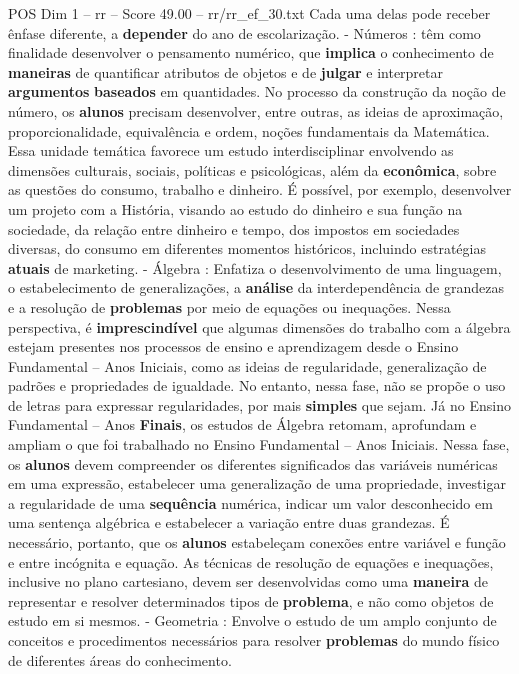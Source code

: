 \begin{textsample}{POS Dim 1 – rr – Score 49.00 – rr/rr\_ef\_30.txt}
Cada uma delas pode receber ênfase diferente, a \textbf{depender} do ano de escolarização. - Números : têm como finalidade desenvolver o pensamento numérico, que \textbf{implica} o conhecimento de \textbf{maneiras} de quantificar atributos de objetos e de \textbf{julgar} e interpretar \textbf{argumentos} \textbf{baseados} em quantidades.
No processo da construção da noção de número, os \textbf{alunos} precisam desenvolver, entre outras, as ideias de aproximação, proporcionalidade, equivalência e ordem, noções fundamentais da Matemática.
Essa unidade temática favorece um estudo interdisciplinar envolvendo as dimensões culturais, sociais, políticas e psicológicas, além da \textbf{econômica}, sobre as questões do consumo, trabalho e dinheiro.
É possível, por exemplo, desenvolver um projeto com a História, visando ao estudo do dinheiro e sua função na sociedade, da relação entre dinheiro e tempo, dos impostos em sociedades diversas, do consumo em diferentes momentos históricos, incluindo estratégias \textbf{atuais} de marketing. - Álgebra : Enfatiza o desenvolvimento de uma linguagem, o estabelecimento de generalizações, a \textbf{análise} da interdependência de grandezas e a resolução de \textbf{problemas} por meio de equações ou inequações.
Nessa perspectiva, é \textbf{imprescindível} que algumas dimensões do trabalho com a álgebra estejam presentes nos processos de ensino e aprendizagem desde o Ensino Fundamental – Anos Iniciais, como as ideias de regularidade, generalização de padrões e propriedades de igualdade.
No entanto, nessa fase, não se propõe o uso de letras para expressar regularidades, por mais \textbf{simples} que sejam.
Já no Ensino Fundamental – Anos \textbf{Finais}, os estudos de Álgebra retomam, aprofundam e ampliam o que foi trabalhado no Ensino Fundamental – Anos Iniciais.
Nessa fase, os \textbf{alunos} devem compreender os diferentes significados das variáveis numéricas em uma expressão, estabelecer uma generalização de uma propriedade, investigar a regularidade de uma \textbf{sequência} numérica, indicar um valor desconhecido em uma sentença algébrica e estabelecer a variação entre duas grandezas.
É necessário, portanto, que os \textbf{alunos} estabeleçam conexões entre variável e função e entre incógnita e equação.
As técnicas de resolução de equações e inequações, inclusive no plano cartesiano, devem ser desenvolvidas como uma \textbf{maneira} de representar e resolver determinados tipos de \textbf{problema}, e não como objetos de estudo em si mesmos. - Geometria : Envolve o estudo de um amplo conjunto de conceitos e procedimentos necessários para resolver \textbf{problemas} do mundo físico de diferentes áreas do conhecimento.

\end{textsample}
